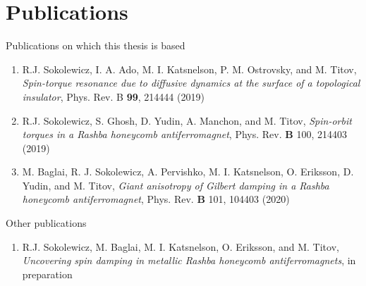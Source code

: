 \manualmark
{}%
%
%
\chapter*{Publications}%
Publications on which this thesis is based
\begin{enumerate}
    \item R.J. Sokolewicz, I. A. Ado, M. I. Katsnelson, P. M. Ostrovsky, and M. Titov, \textit{Spin-torque resonance due to diffusive dynamics at the surface of a topological insulator}, Phys. Rev. B \textbf{99}, 214444 (2019)
    \item R.J. Sokolewicz, S. Ghosh, D. Yudin, A. Manchon, and M. Titov, \textit{Spin-orbit torques in a Rashba honeycomb antiferromagnet}, Phys. Rev. \textbf{B} 100, 214403 (2019)
    \item M. Baglai, R. J. Sokolewicz, A. Pervishko, M. I. Katsnelson, O. Eriksson, D. Yudin, and M. Titov, \textit{Giant anisotropy of Gilbert damping in a Rashba honeycomb antiferromagnet}, Phys. Rev. \textbf{B} 101, 104403 (2020)
\end{enumerate}
Other publications
\begin{enumerate}
    \item R.J. Sokolewicz, M. Baglai, M. I. Katsnelson, O. Eriksson, and M. Titov, \textit{Uncovering spin damping in metallic Rashba honeycomb antiferromagnets}, in preparation
\end{enumerate}